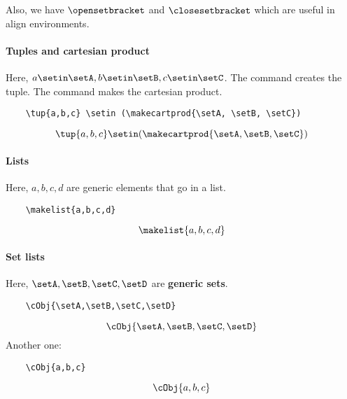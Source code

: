 Also, we have \str{\opensetbracket} $\opensetbracket$ and \str{\closesetbracket} $\closesetbracket$ which are useful in align environments.

\paragraph{Tuples and cartesian product}
Here, $a\setin \setA, b \setin \setB, c \setin \setC$.
The command \str{\tup} creates the tuple. The command \str{\makecartprod} makes the cartesian product.
\begin{verbatim}
    \tup{a,b,c} \setin (\makecartprod{\setA, \setB, \setC})
\end{verbatim}
\begin{equation}
    \tup{a,b,c} \setin (\makecartprod{\setA, \setB, \setC})
\end{equation}


\paragraph{Lists}
Here, $a, b, c, d$ are generic elements that go in a list.
\begin{verbatim}
    \makelist{a,b,c,d}
\end{verbatim}
\begin{equation}
    \makelist{a,b,c,d}
\end{equation}

\paragraph{Set lists}
Here, $\setA, \setB, \setC, \setD$ are \textbf{generic sets}.
\begin{verbatim}
    \cObj{\setA,\setB,\setC,\setD}
\end{verbatim}
\begin{equation}
    \cObj{\setA,\setB,\setC,\setD}
\end{equation}
Another one:
\begin{verbatim}
    \cObj{a,b,c}
\end{verbatim}
\begin{equation}
    \cObj{a,b,c}
\end{equation}

